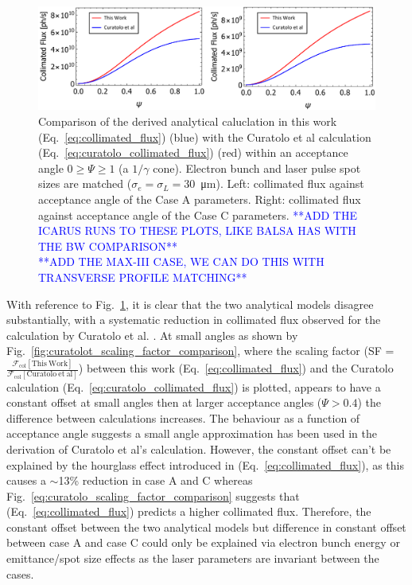 \documentclass[../main.tex]{subfiles}
\begin{document}
\begin{figure}[!h]
\centering
\includegraphics[width=\textwidth]{Figures/Optimisation_and_Characterisation_of_Inverse_Compton_Scattering_Sources/Opt_Char_Fcol_Curatolo_Comp_CaseAC.pdf}
\caption{Comparison of the derived analytical caluclation in this work (Eq.~\ref{eq:collimated_flux}) (blue) with the Curatolo et al \cite{curatolo2017analytical} calculation (Eq.~\ref{eq:curatolo_collimated_flux}) (red) within an acceptance angle $0 \geq \Psi \geq 1$ (a $1/\gamma$ cone). Electron bunch and laser pulse spot sizes are matched ($\sigma_{e}=\sigma_{L}=30$~\si{\micro\meter}). Left: collimated flux against acceptance angle of the Case A parameters. Right: collimated flux against acceptance angle of the Case C parameters. \textcolor{blue}{**ADD THE ICARUS RUNS TO THESE PLOTS, LIKE BALSA HAS WITH THE BW COMPARISON** \\ **ADD THE MAX-III CASE, WE CAN DO THIS WITH TRANSVERSE PROFILE MATCHING**}}
\label{fig:curatolo_collimated_flux_comparison}
\end{figure}

With reference to Fig.~\ref{fig:curatolo_collimated_flux_comparison}, it is clear that the two analytical models disagree substantially, with a systematic reduction in collimated flux observed for the calculation by Curatolo et al. \cite{curatolo2017analytical}. At small angles as shown by Fig.~\ref{fig:curatolot_scaling_factor_comparison}, where the scaling factor (SF = $\frac{\mathcal{F}_{\mathrm{col}}\left[\mathrm{This~ Work}\right]}{\mathcal{F}_{\mathrm{col}}\left[\mathrm{Curatolo~et~ al}\right]}$) between this work (Eq.~\ref{eq:collimated_flux}) and the Curatolo calculation (Eq.~\ref{eq:curatolo_collimated_flux}) is plotted, appears to have a constant offset at small angles then at larger acceptance angles ($\Psi > 0.4$) the difference between calculations increases. The behaviour as a function of acceptance angle suggests a small angle approximation has been used in the derivation of Curatolo et al's \cite{curatolo2017analytical} calculation. However, the constant offset can't be explained by the hourglass effect introduced in (Eq.~\ref{eq:collimated_flux}), as this causes a $\sim$13\% reduction in case A and C whereas Fig.~\ref{eq:curatolo_scaling_factor_comparison} suggests that (Eq.~\ref{eq:collimated_flux}) predicts a higher collimated flux. Therefore, the constant offset between the two analytical models but difference in constant offset between case A and case C could only be explained via electron bunch energy or emittance/spot size effects as the laser parameters are invariant between the cases.
\end{document}
